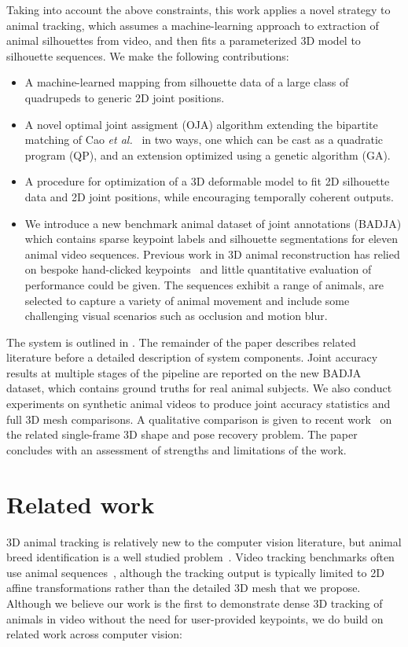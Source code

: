 Taking into account the above constraints, this work applies a novel strategy to animal tracking, which assumes a machine-learning approach to extraction of animal silhouettes from video, and then fits a parameterized 3D model to silhouette sequences.  We make the following contributions:
\begin{itemize}
\item A machine-learned mapping from silhouette data of a large class of quadru\-peds to generic 2D joint positions.
\item A novel optimal joint assigment (OJA) algorithm extending the bipartite matching of Cao {\em et al.}~\cite{cao2017realtime} in two ways, one which can be cast as a quadratic program (QP), and an extension optimized using a genetic algorithm (GA).
\item A procedure for optimization of a 3D deformable model to fit 2D silhouette data and 2D joint positions, while encouraging temporally coherent outputs.
\item We introduce a new benchmark animal dataset of joint annotations (BADJA) which contains sparse keypoint labels and silhouette segmentations for eleven animal video sequences. 
Previous work in 3D animal reconstruction has relied on bespoke hand-clicked keypoints~\cite{zuffi2017menagerie,zuffi_lions} and little quantitative evaluation of performance could be given.
The sequences exhibit a range of animals, are selected to capture a variety of animal movement and include some challenging visual scenarios such as occlusion and motion blur.
\end{itemize}
The system is outlined in .  The remainder of the paper describes related literature before a detailed description of system components.  Joint accuracy results at multiple stages of the pipeline are reported on the new BADJA dataset, which contains ground truths for real animal subjects. We also conduct experiments on synthetic animal videos to produce joint accuracy statistics and full 3D mesh comparisons. A qualitative comparison is given to recent work~\cite{zuffi2017menagerie} on the related single-frame 3D shape and pose recovery problem. The paper concludes with an assessment of strengths and limitations of the work.
\newpage
\section{Related work}
3D animal tracking is relatively new to the computer vision literature, but animal breed identification is a well studied problem~\cite{imagenet_cvpr09}. Video tracking benchmarks often use animal sequences~\cite{DAVIS2017-1st,DAVIS2017-2nd}, although the tracking output is typically limited to 2D affine transformations rather than the detailed 3D mesh that we propose.  Although we believe our work is the first to demonstrate dense 3D tracking of animals in video without the need for user-provided keypoints, we do build on related work across computer vision:

